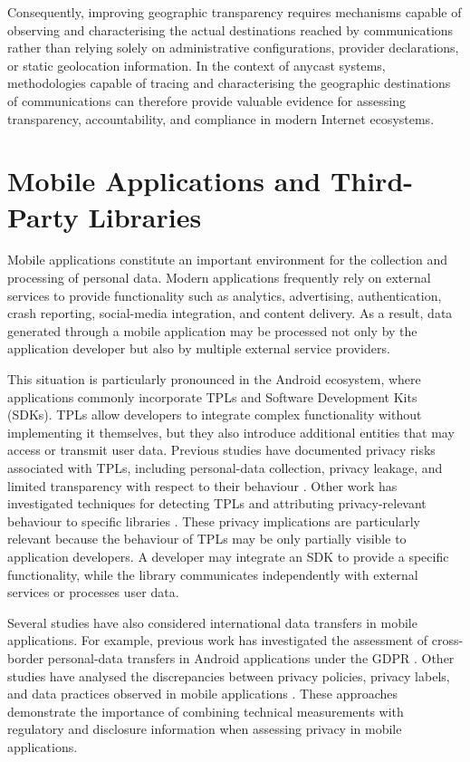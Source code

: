 \documentclass[
A4paper,                %
twoside,                %
openright,              %
chapterprefix=true,     %
12pt,                   %
headings=normal,        %
titlepage=on            %
]{book}
\begin{document}
Consequently, improving geographic transparency requires mechanisms capable of observing and characterising the actual destinations reached by communications rather than relying solely on administrative configurations, provider declarations, or static geolocation information. In the context of anycast systems, methodologies capable of tracing and characterising the geographic destinations of communications can therefore provide valuable evidence for assessing transparency, accountability, and compliance in modern Internet ecosystems.

\section{Mobile Applications and Third-Party Libraries}
\label{sec:background_mobile_applications}

Mobile applications constitute an important environment for the collection and processing of personal data. Modern applications frequently rely on external services to provide functionality such as analytics, advertising, authentication, crash reporting, social-media integration, and content delivery. As a result, data generated through a mobile application may be processed not only by the application developer but also by multiple external service providers.

This situation is particularly pronounced in the Android ecosystem, where applications commonly incorporate TPLs and Software Development Kits (SDKs). TPLs allow developers to integrate complex functionality without implementing it themselves, but they also introduce additional entities that may access or transmit user data. Previous studies have documented privacy risks associated with TPLs, including personal-data collection, privacy leakage, and limited transparency with respect to their behaviour \cite{Pybus2024SuperMobile}. Other work has investigated techniques for detecting TPLs and attributing privacy-relevant behaviour to specific libraries \cite{Rodriguez2025PrivacySDKs}. These privacy implications are particularly relevant because the behaviour of TPLs may be only partially visible to application developers. A developer may integrate an SDK to provide a specific functionality, while the library communicates independently with external services or processes user data.

Several studies have also considered international data transfers in mobile applications. For example, previous work has investigated the assessment of cross-border personal-data transfers in Android applications under the GDPR \cite{Guaman2023AutomatedApplications}. Other studies have analysed the discrepancies between privacy policies, privacy labels, and data practices observed in mobile applications \cite{Jain2023ATLAS:Labels}. These approaches demonstrate the importance of combining technical measurements with regulatory and disclosure information when assessing privacy in mobile applications.
\end{document}
